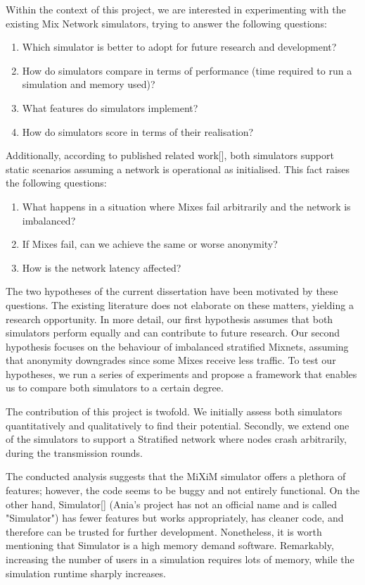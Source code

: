 \documentclass[logo,msc,cyber]{infthesis}   %
\begin{document}
Within the context of this project, we are interested in experimenting with the
existing Mix Network simulators, trying to answer the following questions:  

\begin{enumerate}
   \item Which simulator is better to adopt for future research and development?
   \item How do simulators compare in terms of performance (time required to run a simulation and memory used)?
   \item What features do simulators implement?
   \item How do simulators score in terms of their realisation?
\end{enumerate}
 
Additionally, according to published related work[], both simulators support
static scenarios assuming a network is operational as initialised. This fact
raises the following questions:

\begin{enumerate}
   \item What happens in a situation where Mixes fail arbitrarily and the network is imbalanced?
   \item If Mixes fail, can we achieve the same or worse anonymity?
   \item How is the network latency affected?
\end{enumerate}

The two hypotheses of the current dissertation have been motivated by these
questions. The existing literature does not elaborate on these matters, yielding
a research opportunity. In more detail, our first hypothesis assumes that both
simulators perform equally and can contribute to future research. Our second
hypothesis focuses on the behaviour of imbalanced stratified Mixnets, assuming
that anonymity downgrades since some Mixes receive less traffic. To test our
hypotheses, we run a series of experiments and propose a framework that enables
us to compare both simulators to a certain degree.

The contribution of this project is twofold. We initially assess both simulators
quantitatively and qualitatively to find their potential. Secondly, we extend
one of the simulators to support a Stratified network where nodes crash
arbitrarily, during the transmission rounds.

The conducted analysis suggests that the MiXiM simulator offers a plethora of
features; however, the code seems to be buggy and not entirely functional. On
the other hand, Simulator[] (Ania's project has not an official name and is
called "Simulator") has fewer features but works appropriately, has cleaner
code, and therefore can be trusted for further development. Nonetheless, it is
worth mentioning that Simulator is a high memory demand software. Remarkably,
increasing the number of users in a simulation requires lots of memory, while
the simulation runtime sharply increases.
\end{document}
